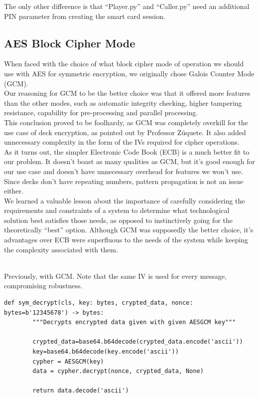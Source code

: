 \documentclass[11pt]{article}
\begin{document}
The only other difference is that “Player.py” and “Caller.py” need an additional PIN parameter from creating the smart card session.

\subsection{AES Block Cipher Mode}\label{aes block Cipher Mode}
When faced with the choice of what block cipher mode of operation we should use with AES for symmetric encryption, we originally chose Galois Counter Mode (GCM).\\
Our reasoning for GCM to be the better choice was that it offered more features than the other modes, such as automatic integrity checking, higher tampering resistance, capability for pre-processing and parallel processing.\\
This conclusion proved to be foolhardy, as GCM was completely overkill for the use case of deck encryption, as pointed out by Professor Zúquete. It also added unnecessary complexity in the form of the IVs required for cipher operations.\\
As it turns out, the simpler Electronic Code Book (ECB) is a much better fit to our problem. It doesn’t boast as many qualities as GCM, but it’s good enough for our use case and doesn’t have unnecessary overhead for features we won’t use. Since decks don’t have repeating numbers, pattern propagation is not an issue either.\\
We learned a valuable lesson about the importance of carefully considering the requirements and constraints of a system to determine what technological solution best satisfies those needs, as opposed to instinctively going for the theoretically “best” option. Although GCM was supposedly the better choice, it’s advantages over ECB were superfluous to the needs of the system while keeping the complexity associated with them.
\\
\\
\begin{Large}
Previously, with GCM. Note that the same IV is used for every message, compromising robustness.
\end{Large} 
\begin{lstlisting}[captionpos=b label=listing:sparql_getallindividuals,
   basicstyle=\ttfamily]def sym_decrypt(cls, key: bytes, crypted_data, nonce: bytes=b'12345678') -> bytes:
        """Decrypts encrypted data given with given AESGCM key"""

        crypted_data=base64.b64decode(crypted_data.encode('ascii'))
        key=base64.b64decode(key.encode('ascii'))
        cypher = AESGCM(key) 
        data = cypher.decrypt(nonce, crypted_data, None)
         
        return data.decode('ascii')
\end{lstlisting}
\end{document}
